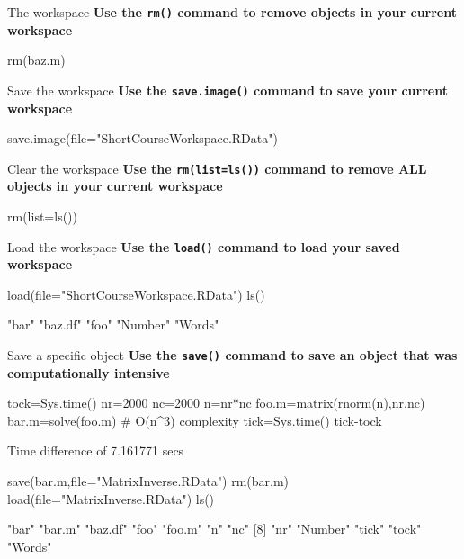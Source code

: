 \documentclass{beamer}\usepackage[]{graphicx}\usepackage[]{color}
\begin{document}
\begin{frame}[fragile]{The workspace}
  \textbf{Use the \texttt{rm()} command to remove objects in your current workspace}
\begin{Schunk}
\begin{Sinput}
rm(baz.m)
\end{Sinput}
\end{Schunk}
\end{frame}

\begin{frame}[fragile]{Save the workspace}
   \textbf{Use the \texttt{save.image()} command to save your current workspace}
\begin{Schunk}
\begin{Sinput}
save.image(file="ShortCourseWorkspace.RData")
\end{Sinput}
\end{Schunk}
\end{frame}

\begin{frame}[fragile]{Clear the workspace}
  \textbf{Use the \texttt{rm(list=ls())} command to remove ALL objects in your current workspace}
\begin{Schunk}
\begin{Sinput}
rm(list=ls())
\end{Sinput}
\end{Schunk}
\end{frame}

\begin{frame}[fragile]{Load the workspace}
   \textbf{Use the \texttt{load()} command to load your
     saved workspace}
\begin{Schunk}
\begin{Sinput}
load(file="ShortCourseWorkspace.RData")
ls()
\end{Sinput}
\begin{Soutput}
[1] "bar"    "baz.df" "foo"    "Number" "Words" 
\end{Soutput}
\end{Schunk}
\end{frame}

\begin{frame}[fragile]{Save a specific object}
  \textbf{Use the \texttt{save()} command to save an object that was computationally intensive}
\begin{Schunk}
\begin{Sinput}
tock=Sys.time()
nr=2000
nc=2000
n=nr*nc
foo.m=matrix(rnorm(n),nr,nc)
bar.m=solve(foo.m)  # O(n^3) complexity
tick=Sys.time()
tick-tock
\end{Sinput}
\begin{Soutput}
Time difference of 7.161771 secs
\end{Soutput}
\begin{Sinput}
save(bar.m,file="MatrixInverse.RData")
rm(bar.m)
load(file="MatrixInverse.RData")
ls()
\end{Sinput}
\begin{Soutput}
 [1] "bar"    "bar.m"  "baz.df" "foo"    "foo.m"  "n"      "nc"    
 [8] "nr"     "Number" "tick"   "tock"   "Words" 
\end{Soutput}
\end{Schunk}
\end{frame}
\end{document}
